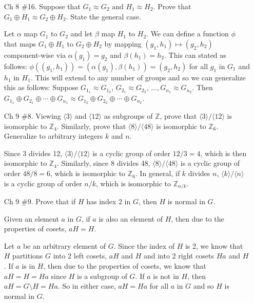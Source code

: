 \documentclass{article}
\newcommand{\Z}{\mathbb Z}
\begin{document}
\begin{enumerate}
    \item[Ch 8 \#16.]Suppose that $G_1 \approx G_2 \text { and } H_1 \approx H_2.$ Prove that $G_1 \oplus H_1 \approx G_2 \oplus H_2$. State the general case.
    
    \begin{flushleft}
    Let $\alpha$ map $G_1$ to $G_2$ and let $\beta$ map $H_1$ to $H_2$. We can define a function $\phi$ that maps  $G_1 \oplus H_1$ to $G_2 \oplus H_2$ by mapping $(g_1, h_1) \mapsto (g_2, h_2)$ component-wise via $\alpha(g_1) = g_2$ and $\beta(h_1) = h_2$. This can stated as follows: $\phi((g_1, h_1)) = (\alpha(g_1), \beta(h_1)) = (g_2, h_2)$ for all $g_1$ in $G_1$ and $h_1$ in $H_1$. This will extend to any number of groups and so we can generalize this as follows: Suppose $G_{1_1} \approx G_{1_2}$, $G_{2_1} \approx G_{2_2}$, $\ldots, G_{n_1} \approx G_{n_2}$. Then $G_{1_1} \oplus G_{2_1} \oplus \cdots \oplus G_{n_1} \approx G_{1_2} \oplus G_{2_2} \oplus \cdots \oplus G_{n_2}$.
    \end{flushleft}

    \item[Ch 9 \#8.]Viewing $\langle3\rangle$ and $\langle12\rangle$ as subgroups of $\Z$, prove that $\langle3\rangle/\langle12\rangle$ is isomorphic to $\Z_4$. Similarly, prove that $\langle8\rangle/\langle48\rangle$ is isomorphic to $\Z_6$. Generalize to arbitrary integers $k$ and $n$.
    
    \begin{flushleft}
    Since 3 divides 12, $\langle3\rangle/\langle12\rangle$ is a cyclic group of order $12/3 = 4$, which is then isomorphic to $\Z_4$. Similarly, since 8 divides 48, $\langle8\rangle/\langle48\rangle$ is a cyclic group of order $48/8 = 6$, which is isomorphic to $\Z_6$. In general, if $k$ divides $n$, $\langle k\rangle/\langle n\rangle$ is a cyclic group of order $n/k$, which is isomorphic to $\Z_{n/k}$.
    \end{flushleft}
    \newpage
    \item[Ch 9 \#9.]Prove that if $H$ has index 2 in $G$, then $H$ is normal in $G$.
    
    \begin{flushleft}
    Given an element $a$ in $G$, if $a$ is also an element of $H$, then due to the properties of cosets, $aH = H$.
    
    Let $a$ be an arbitrary element of $G$. Since the index of $H$ is 2, we know that $H$ partitions $G$ into 2 left cosets, $aH$ and $H$ and into 2 right cosets $Ha$ and $H$. If $a$ is in $H$, then due to the properties of cosets, we know that $aH = H = Ha$ since $H$ is a subgroup of $G$. If $a$ is not in $H$, then $aH = G\setminus H = Ha$. So in either case, $aH = Ha$ for all $a$ in $G$ and so $H$ is normal in $G$.
    \end{flushleft}


\end{enumerate}
\end{document}
